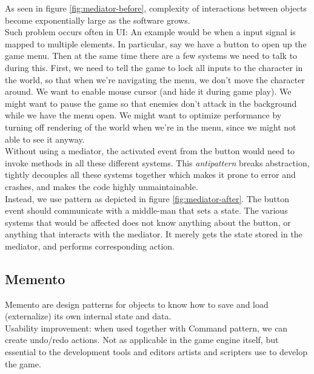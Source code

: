 \begin{multicols}{2}
As seen in figure \ref{fig:mediator-before}, complexity of interactions between objects become exponentially large as the software grows.\bs
\\
Such problem occurs often in UI: An example would be when a input signal is mapped to multiple elements. In particular, say we have a button to open up the game menu. Then at the same time there are a few systems we need to talk to during this. First, we need to tell the game to lock all inputs to the character in the world, so that when we're navigating the menu, we don't move the character around. We want to enable mouse cursor (and hide it during game play). We might want to pause the game so that enemies don't attack in the background while we have the menu open. We might want to optimize performance by turning off rendering of the world when we're in the menu, since we might not able to see it anyway.\bs
\\
Without using a mediator, the activated event from the button would need to invoke methods in all these different systems. This \textit{antipattern} breaks abstraction, tightly decouples all these systems together which makes it prone to error and crashes, and makes the code highly unmaintainable.\bs
\\
Instead, we use pattern as depicted in figure \ref{fig:mediator-after}. The button event should communicate with a middle-man that sets a state. The various systems that would be affected does not know anything about the button, or anything that interacts with the mediator. It merely gets the state stored in the mediator, and performs corresponding action.\bs
\\


\subsection{Memento}

Memento are design patterns for objects to know how to save and load (externalize) its own internal state and data.\bs
\\
Usability improvement: when used together with Command pattern, we can create undo/redo actions. Not as applicable in the game engine itself, but essential to the development tools and editors artists and scripters use to develop the game.\bs
\\


\end{multicols}
